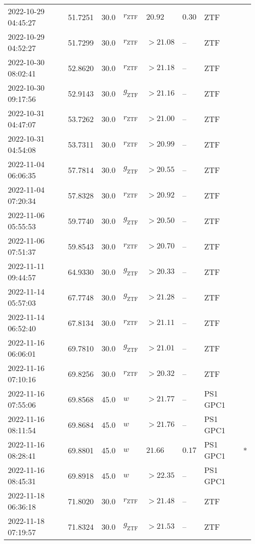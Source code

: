 \documentclass{nature_plusfigure}
\begin{document}
\begin{supplement}
\begin{center}
\begin{longtable}{llllllll}
2022-10-29 04:45:27 & 51.7251 & 30.0 & ${r}_\mathrm{ZTF}$ & $20.92$ & $0.30$ & ZTF &  \\ 
2022-10-29 04:52:27 & 51.7299 & 30.0 & ${r}_\mathrm{ZTF}$ & $>21.08$ & -- & ZTF &  \\ 
2022-10-30 08:02:41 & 52.8620 & 30.0 & ${r}_\mathrm{ZTF}$ & $>21.18$ & -- & ZTF &  \\ 
2022-10-30 09:17:56 & 52.9143 & 30.0 & ${g}_\mathrm{ZTF}$ & $>21.16$ & -- & ZTF &  \\ 
2022-10-31 04:47:07 & 53.7262 & 30.0 & ${r}_\mathrm{ZTF}$ & $>21.00$ & -- & ZTF &  \\ 
2022-10-31 04:54:08 & 53.7311 & 30.0 & ${r}_\mathrm{ZTF}$ & $>20.99$ & -- & ZTF &  \\ 
2022-11-04 06:06:35 & 57.7814 & 30.0 & ${g}_\mathrm{ZTF}$ & $>20.55$ & -- & ZTF &  \\ 
2022-11-04 07:20:34 & 57.8328 & 30.0 & ${r}_\mathrm{ZTF}$ & $>20.92$ & -- & ZTF &  \\ 
2022-11-06 05:55:53 & 59.7740 & 30.0 & ${g}_\mathrm{ZTF}$ & $>20.50$ & -- & ZTF &  \\ 
2022-11-06 07:51:37 & 59.8543 & 30.0 & ${r}_\mathrm{ZTF}$ & $>20.70$ & -- & ZTF &  \\ 
2022-11-11 09:44:57 & 64.9330 & 30.0 & ${g}_\mathrm{ZTF}$ & $>20.33$ & -- & ZTF &  \\ 
2022-11-14 05:57:03 & 67.7748 & 30.0 & ${g}_\mathrm{ZTF}$ & $>21.28$ & -- & ZTF &  \\ 
2022-11-14 06:52:40 & 67.8134 & 30.0 & ${r}_\mathrm{ZTF}$ & $>21.11$ & -- & ZTF &  \\ 
2022-11-16 06:06:01 & 69.7810 & 30.0 & ${g}_\mathrm{ZTF}$ & $>21.01$ & -- & ZTF &  \\ 
2022-11-16 07:10:16 & 69.8256 & 30.0 & ${r}_\mathrm{ZTF}$ & $>20.32$ & -- & ZTF &  \\ 
2022-11-16 07:55:06 & 69.8568 & 45.0 & $w$ & $>21.77$ & -- & PS1 GPC1 &  \\ 
2022-11-16 08:11:54 & 69.8684 & 45.0 & $w$ & $>21.76$ & -- & PS1 GPC1 &  \\ 
2022-11-16 08:28:41 & 69.8801 & 45.0 & $w$ & $21.66$ & $0.17$ & PS1 GPC1 & * \\ 
2022-11-16 08:45:31 & 69.8918 & 45.0 & $w$ & $>22.35$ & -- & PS1 GPC1 &  \\ 
2022-11-18 06:36:18 & 71.8020 & 30.0 & ${r}_\mathrm{ZTF}$ & $>21.48$ & -- & ZTF &  \\ 
2022-11-18 07:19:57 & 71.8324 & 30.0 & ${g}_\mathrm{ZTF}$ & $>21.53$ & -- & ZTF &  \\ 

\end{longtable}
\end{center}
\end{supplement}
\end{document}
